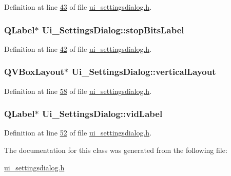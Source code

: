 Definition at line \hyperlink{a00054_source_l00043}{43} of file \hyperlink{a00054_source}{ui\+\_\+settingsdialog.\+h}.

\hypertarget{a00029_a665748b39dda24475690e2363b72e265}{
\subsubsection[{stop\+Bits\+Label}]{\setlength{\rightskip}{0pt plus 5cm}Q\+Label$\ast$ Ui\+\_\+\+Settings\+Dialog\+::stop\+Bits\+Label}}\label{a00029_a665748b39dda24475690e2363b72e265}


Definition at line \hyperlink{a00054_source_l00042}{42} of file \hyperlink{a00054_source}{ui\+\_\+settingsdialog.\+h}.

\hypertarget{a00029_aad19d26806d7e14548233852ac97c26f}{
\subsubsection[{vertical\+Layout}]{\setlength{\rightskip}{0pt plus 5cm}Q\+V\+Box\+Layout$\ast$ Ui\+\_\+\+Settings\+Dialog\+::vertical\+Layout}}\label{a00029_aad19d26806d7e14548233852ac97c26f}


Definition at line \hyperlink{a00054_source_l00058}{58} of file \hyperlink{a00054_source}{ui\+\_\+settingsdialog.\+h}.

\hypertarget{a00029_a50c8fdd36faae6146740e37728af71f2}{
\subsubsection[{vid\+Label}]{\setlength{\rightskip}{0pt plus 5cm}Q\+Label$\ast$ Ui\+\_\+\+Settings\+Dialog\+::vid\+Label}}\label{a00029_a50c8fdd36faae6146740e37728af71f2}


Definition at line \hyperlink{a00054_source_l00052}{52} of file \hyperlink{a00054_source}{ui\+\_\+settingsdialog.\+h}.



The documentation for this class was generated from the following file\+:\begin{DoxyCompactItemize}
\item 
\hyperlink{a00054}{ui\+\_\+settingsdialog.\+h}\end{DoxyCompactItemize}

